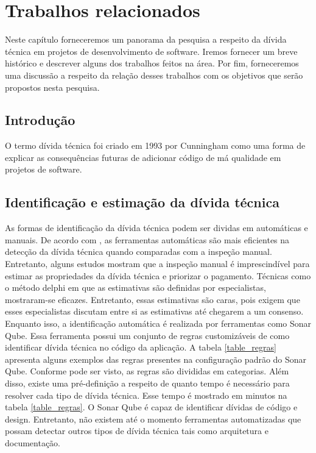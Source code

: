 \chapter{Trabalhos relacionados}
\label{relacionados}

Neste capítulo forneceremos um panorama da pesquisa a respeito da dívida técnica em projetos de desenvolvimento de software. Iremos fornecer um breve histórico e descrever alguns dos trabalhos feitos na área. Por fim, forneceremos uma discussão a respeito da relação desses trabalhos com os objetivos que serão propostos nesta pesquisa. 


\section{Introdução}


O termo dívida técnica foi criado em 1993 por Cunningham \cite{cunningham1993wycash} como uma forma de explicar as consequências futuras de adicionar código de má qualidade em projetos de software. 












\section{Identificação e estimação da dívida técnica}

As formas de identificação da dívida técnica podem ser dividas em automáticas e manuais. De acordo com \cite{zazworka2013case},  as ferramentas automáticas são mais eficientes na detecção da dívida técnica quando comparadas com a inspeção manual. Entretanto, alguns estudos mostram que a inspeção manual é imprescindível para estimar as propriedades da dívida técnica e priorizar o pagamento. Técnicas como o método delphi\cite{szabados2015technical} em que as estimativas são definidas por especialistas, mostraram-se eficazes. Entretanto, essas estimativas são caras, pois exigem que esses especialistas discutam entre si as estimativas até chegarem a um consenso. Enquanto isso, a identificação automática é realizada por ferramentas como Sonar Qube\cite{campbell2013sonarqube}. Essa ferramenta possui um conjunto de regras customizáveis de como identificar dívida técnica no código da aplicação. A tabela \ref{table_regras} apresenta alguns exemplos das regras presentes na configuração padrão do Sonar Qube. Conforme pode ser visto, as regras são divididas em categorias. Além disso, existe uma pré-definição a respeito de quanto tempo é necessário para resolver cada tipo de dívida técnica. Esse tempo é mostrado em minutos na tabela \ref{table_regras}. O Sonar Qube é capaz de identificar dívidas de código e design. Entretanto, não existem até o momento ferramentas automatizadas que possam detectar outros tipos de dívida técnica tais como arquitetura e documentação.

